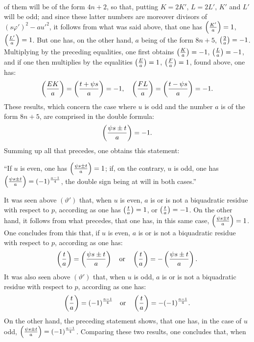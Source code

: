 \noindent
of them will be of the form $4n+2$, so that, putting $K=2K'$, $L=2L'$, $K'$
and $L'$ will be odd; and since these latter numbers are moreover divisors
of $(s\varphi')^2-au'^2$, it follows from what was said above, that one has $\left(\frac{K'}{a}\right)=1$,
$\left(\frac{L'}{a}\right)=1$. But one has, on the other hand, $a$ being of the form $8n+5$,
$\left(\frac{2}{a}\right)=-1$. Multiplying by the preceding equalities, one first obtains
$\left(\frac{K}{a}\right)=-1$, $\left(\frac{L}{a}\right)=-1$, and if one then multiplies by the equalities
$\left(\frac{E}{a}\right)=1$, $\left(\frac{F}{a}\right)=1$, found above, one has:
\[
\left(\frac{EK}{a}\right)=\left(\frac{t+\psi s}{a}\right)=-1,\quad\left(\frac{FL}{a}\right)=\left(\frac{t-\psi s}{a}\right)=-1.
\]
These results, which concern the case where $u$ is odd and the number $a$ is
of the form $8n+5$, are comprised in the double formula:
\[
\left(\frac{\psi s\pm t}{a}\right)=-1.
\]
Summing up all that precedes, one obtains this statement:
\par\indent
“If $u$ is even, one has $\left(\frac{\psi s\pm t}{a}\right)=1$; if, on the contrary, $u$ is odd, one has
$\left(\frac{\psi s\pm t}{a}\right)=(-1)^{\frac{a-1}{4}}$, the double sign being at will in both cases.”
\par\indent
It was seen above $(\vartheta')$ that, when $u$ is even, $a$ is or is not a biquadratic
residue with respect to $p$, according as one has $\left(\frac{t}{a}\right)=1$, or $\left(\frac{t}{a}\right)=-1$.
On the other hand, it follows from what precedes, that one has, in this same case,
$\left(\frac{\psi s\pm t}{a}\right)=1$. One concludes from this that, if $u$ is even, $a$ is or is not a biquadratic
residue with respect to $p$, according as one has:
\[
\left(\frac{t}{a}\right)=\left(\frac{\psi s\pm t}{a}\right)\quad\text{or}\quad
\left(\frac{t}{a}\right)=-\left(\frac{\psi s\pm t}{a}\right).
\]
It was also seen above $(\vartheta')$ that, when $u$ is odd, $a$ is or is not
a biquadratic residue with respect to $p$, according as one has:
\[
\left(\frac{t}{a}\right)=(-1)^{\frac{a-1}{4}}\quad\text{or}\quad
\left(\frac{t}{a}\right)=-(-1)^{\frac{a-1}{4}}.
\]
On the other hand, the preceding statement shows, that one has, in the case of $u$ odd,
$\left(\frac{\psi s\pm t}{a}\right)=(-1)^{\frac{a-1}{4}}$. Comparing these two results, one concludes that, when

